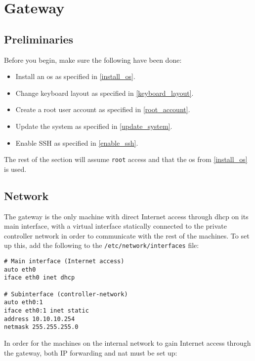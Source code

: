 \chapter{Gateway}


\section{Preliminaries}

Before you begin, make sure the following have been done:

\begin{itemize}
    \item Install an \gls{os} as specified in \ref{install_os}.
    \item Change keyboard layout as specified in \ref{keyboard_layout}.
    \item Create a root user account as specified in \ref{root_account}.
    \item Update the system as specified in \ref{update_system}.
    \item Enable SSH as specified in \ref{enable_ssh}.
\end{itemize}

The rest of the section will assume \lstinline{root} access and that the \gls{os} from \ref{install_os} is used.


\section{Network}

The gateway is the only machine with direct Internet access through \gls{dhcp} on its main interface, with a virtual interface statically connected to the private controller network in order to communicate with the rest of the machines. To set up this, add the following to the \lstinline{/etc/network/interfaces} file:

\begin{lstlisting}
# Main interface (Internet access)
auto eth0
iface eth0 inet dhcp

# Subinterface (controller-network)
auto eth0:1
iface eth0:1 inet static
address 10.10.10.254
netmask 255.255.255.0
\end{lstlisting}

In order for the machines on the internal network to gain Internet access through the gateway, both IP forwarding and \gls{nat} must be set up:

